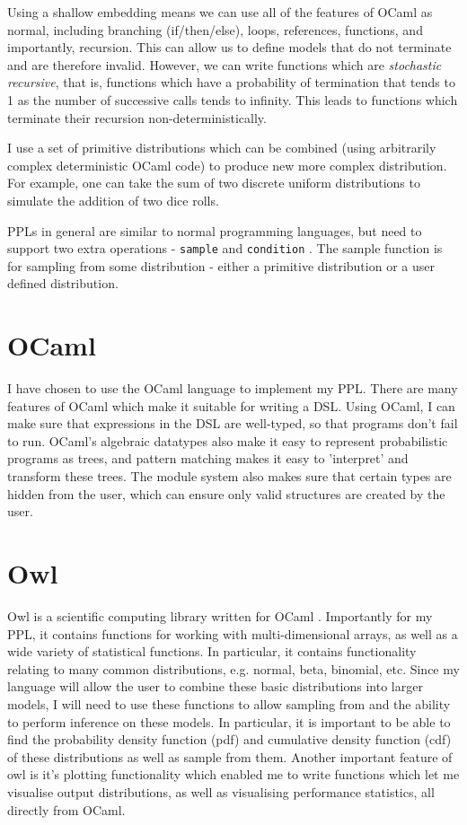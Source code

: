 Using a shallow embedding means we can use all of the features of OCaml as normal, including branching (if/then/else), loops, references, functions, and importantly, recursion. This can allow us to define models that do not terminate and are therefore invalid. However, we can write functions which are \textit{stochastic recursive}, that is, functions which have a probability of termination that tends to 1 as the number of successive calls tends to infinity. This leads to functions which terminate their recursion non-deterministically.

I use a set of primitive distributions which can be combined (using arbitrarily complex deterministic OCaml code) to produce new more complex distribution. For example, one can take the sum of two discrete uniform distributions to simulate the addition of two dice rolls. 

PPLs in general are similar to normal programming languages, but need to support two extra operations - \texttt{sample} and \texttt{condition} \cite{}. The sample function is for sampling from some distribution - either a primitive distribution or a user defined distribution.

\section{OCaml}
I have chosen to use the OCaml language to implement my PPL. There are many features of OCaml which make it suitable for writing a DSL. Using OCaml, I can make sure that expressions in the DSL are well-typed, so that programs don't fail to run. OCaml's algebraic datatypes also make it easy to represent probabilistic programs as trees, and pattern matching makes it easy to 'interpret' and transform these trees. The module system also makes sure that certain types are hidden from the user, which can ensure only valid structures are created by the user.

\section{Owl}

Owl is a scientific computing library written for OCaml \cite{owl}. Importantly for my PPL, it contains functions for working with multi-dimensional arrays, as well as a wide variety of statistical functions. In particular, it contains functionality relating to many common distributions, e.g. normal, beta, binomial, etc. Since my language will allow the user to combine these basic distributions into larger models, I will need to use these functions to allow sampling from and the ability to perform inference on these models. In particular, it is important to be able to find the probability density function (pdf) and cumulative density function (cdf) of these distributions as well as sample from them. Another important feature of owl is it's plotting functionality which enabled me to write functions which let me visualise output distributions, as well as visualising performance statistics, all directly from OCaml.

